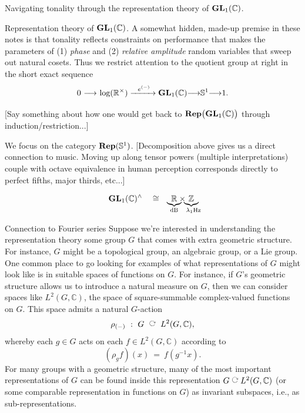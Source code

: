 \documentclass[letterpaper,11pt, reqno]{amsart}
\newtheorem{monodromy theorem}{Monodromy Theorem}[subsection]
\newtheorem{wild conjecture}[theorem]{Wild Conjecture}
\newtheorem{research objectives}{Research objectives}[subsection]
\newtheorem{research question}[theorem]{Research questions}
\newtheorem{aside question}[theorem]{Aside question}
\newtheorem{audio example}[theorem]{\loudspeaker[3] Example}
\newtheorem{blank remark}[theorem]{}
\newtheorem{terminology and comment}[theorem]{Terminology and comment}
\newtheorem{purity hypothesis}[theorem]{Purity hypothesis}
\newtheorem{corollary of the purity hypothesis}[theorem]{Corollary of the purity hypothesis}
\newcommand{\CC} {{\mathbb C}}
\newcommand{\RR} {{\mathbb R}}
\newcommand{\ZZ} {{\mathbb Z}}
\newcommand{\lra}{{\longrightarrow}}
\newcommand{\lact}{\ \raisebox{8pt}{\rotatebox{-90}{$\circlearrowright$}}\ }
\numberwithin{equation}{theorem}
\begin{document}
\begin{section}{Navigating tonality through the representation theory of $\bold{GL}_{1}(\CC)$.}
\begin{subsection}{Representation theory of $\bold{GL}_{1}(\CC)$.}
A somewhat hidden, made-up premise in these notes is that tonality reflects constraints on performance that makes the parameters of (1) {\em phase} and (2) {\em relative amplitude} random variables that sweep out natural cosets. Thus we restrict attention to the quotient group at right in the short exact sequence
	$$
	0
	\ \lra\ 
	\text{log}(\RR^\times)\xrightarrow{\ \ e^{(-)}\ }
	\bold{GL}_{1}(\CC)
	\lra
	\mathbb{S}^{1}
	\lra
	1.
	$$

{\color{red} [Say something about how one would get back to $\bold{Rep}\big(\bold{GL}_{1}(\CC)\big)$ through induction/restriction...]}

	We focus on the category $\bold{Rep}(\mathbb{S}^{1})$. {\color{red} [Decomposition above gives us a direct connection to music. Moving up along tensor powers (multiple interpretations) couple with octave equivalence in human perception corresponds directly to perfect fifths, major thirds, etc...]}
	
$$
\bold{GL}_{1}(\CC)^\wedge
\ \ \ \cong\ \ \ 
\underset{\!\!\!\!\text{dB}\!\!\!\!}{\!\!\underbrace{\RR}\!\!}\!\times\!\underset{\lambda_{1}\text{Hz}\!\!\!\!}{\!\!\underbrace{\ZZ}\!\!}
$$
\end{subsection}

\begin{subsection}{Connection to Fourier series}
Suppose we're interested in understanding the representation theory some group $G$ that comes with extra geometric structure. For instance, $G$ might be a topological group, an algebraic group, or a Lie group. One common place to go looking for examples of what representations of $G$ might look like is in suitable spaces of functions on $G$. For instance, if $G$'s geometric structure allows us to introduce a natural measure on $G$, then we can consider spaces like $L^2(G,\CC)$, the space of square-summable complex-valued functions on $G$. This space admits a natural $G$-action
	$$
	\rho_{(-)}\ :\ G
	\ 
	\lact
	\ 
	L^2(G,\CC),
	$$
whereby each $g\in G$ acts on each $f\in L^2(G,\CC)$ according to
	$$
	(\rho_{g}f)(x)
	\ =\ 
	f(g^{-1}x).
	$$
For many groups with a geometric structure, many of the most important representations of $G$ can be found inside this representation $G\lact L^2(G,\CC)$ (or some comparable representation in functions on $G$) as invariant subspaces, i.e., as sub-representations.


\end{subsection}
\end{section}
\end{document}
